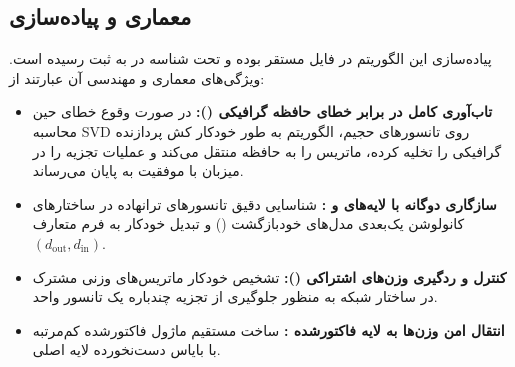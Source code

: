 \subsection{معماری و پیاده‌سازی}
پیاده‌سازی این الگوریتم در فایل  مستقر بوده و تحت شناسه  در  به ثبت رسیده است. ویژگی‌های معماری و مهندسی آن عبارتند از:
\begin{itemize}
    \item \textbf{تاب‌آوری کامل در برابر خطای حافظه گرافیکی ():} در صورت وقوع خطای  حین محاسبه SVD روی تانسورهای حجیم، الگوریتم به طور خودکار کش پردازنده گرافیکی را تخلیه کرده، ماتریس را به حافظه  منتقل می‌کند و عملیات تجزیه را در میزبان با موفقیت به پایان می‌رساند.
    \item \textbf{سازگاری دوگانه با لایه‌های  و :} شناسایی دقیق تانسورهای ترانهاده در ساختارهای کانولوشن یک‌بعدی مدل‌های خودبازگشت () و تبدیل خودکار به فرم متعارف $(d_{\text{out}}, d_{\text{in}})$.
    \item \textbf{کنترل و ردگیری وزن‌های اشتراکی ():} تشخیص خودکار ماتریس‌های وزنی مشترک در ساختار شبکه به منظور جلوگیری از تجزیه چندباره یک تانسور واحد.
    \item \textbf{انتقال امن وزن‌ها به لایه فاکتورشده :} ساخت مستقیم ماژول فاکتورشده کم‌مرتبه با بایاس دست‌نخورده لایه اصلی.
\end{itemize}
